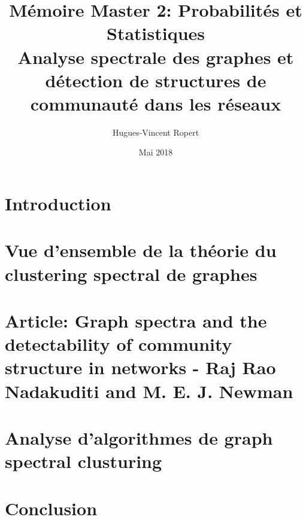 \documentclass{article} %
\title{Mémoire Master 2: Probabilités et Statistiques  \\ Analyse spectrale des graphes et détection de structures de communauté dans les réseaux}
\author{Hugues-Vincent Ropert}
\date{Mai 2018}
\begin{document}
\maketitle
\newpage

\tableofcontents
\newpage

\part{Introduction}

\part{Vue d'ensemble de la théorie du clustering spectral de graphes}



\part{Article: Graph spectra and the detectability of community structure in networks - Raj Rao Nadakuditi and M. E. J. Newman}




\nocite{*}

\part{Analyse d'algorithmes de graph spectral clusturing}



\appendix

\part{Conclusion}




\end{document}
